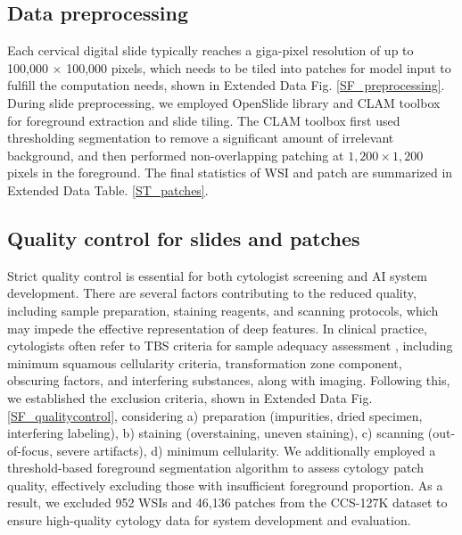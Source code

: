 \subsection*{Data preprocessing}\label{subsec4-2}
Each cervical digital slide typically reaches a giga-pixel resolution of up to 100,000 $\times$ 100,000 pixels, which needs to be tiled into patches for model input to fulfill the computation needs, shown in Extended Data Fig. \ref{SF_preprocessing}. 
During slide preprocessing, we employed OpenSlide library \cite{goode2013openslide} and CLAM toolbox \cite{lu2021data} for foreground extraction and slide tiling. The CLAM toolbox first used thresholding segmentation to remove a significant amount of irrelevant background, and then performed non-overlapping patching at \(1,200 \times 1,200\) pixels in the foreground. The final statistics of WSI and patch are summarized in Extended Data Table. \ref{ST_patches}.

\subsection*{Quality control for slides and patches}\label{subsec4-3}
Strict quality control is essential for both cytologist screening and AI system development. There are several factors contributing to the reduced quality, including sample preparation, staining reagents, and scanning protocols, which may impede the effective representation of deep features. In clinical practice, cytologists often refer to TBS criteria for sample adequacy assessment \cite{nayar2015bethesda}, including minimum squamous cellularity criteria, transformation zone component, obscuring factors, and interfering substances, along with imaging. Following this, we established the exclusion criteria, shown in Extended Data Fig. \ref{SF_qualitycontrol}, considering a) preparation (impurities, dried specimen, interfering labeling), b) staining (overstaining, uneven staining), c) scanning (out-of-focus, severe artifacts), d) minimum cellularity. We additionally employed a threshold-based foreground segmentation algorithm to assess cytology patch quality, effectively excluding those with insufficient foreground proportion. As a result, we excluded 952 WSIs and 46,136 patches from the CCS-127K dataset to ensure high-quality cytology data for system development and evaluation. 

